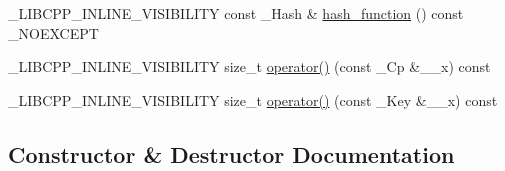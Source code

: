 \begin{DoxyCompactItemize}
\item 
\+\_\+\+L\+I\+B\+C\+P\+P\+\_\+\+I\+N\+L\+I\+N\+E\+\_\+\+V\+I\+S\+I\+B\+I\+L\+I\+T\+Y const \+\_\+\+Hash \& \hyperlink{class______map__hasher_3_01___key_00_01___cp_00_01___hash_00_01false_01_4_a36b4694cf944a1a28969d3f6917cc9a9}{hash\+\_\+function} () const \+\_\+\+N\+O\+E\+X\+C\+E\+P\+T
\item 
\+\_\+\+L\+I\+B\+C\+P\+P\+\_\+\+I\+N\+L\+I\+N\+E\+\_\+\+V\+I\+S\+I\+B\+I\+L\+I\+T\+Y size\+\_\+t \hyperlink{class______map__hasher_3_01___key_00_01___cp_00_01___hash_00_01false_01_4_a4320bf7187c7c20511393415142a3651}{operator()} (const \+\_\+\+Cp \&\+\_\+\+\_\+x) const 
\item 
\+\_\+\+L\+I\+B\+C\+P\+P\+\_\+\+I\+N\+L\+I\+N\+E\+\_\+\+V\+I\+S\+I\+B\+I\+L\+I\+T\+Y size\+\_\+t \hyperlink{class______map__hasher_3_01___key_00_01___cp_00_01___hash_00_01false_01_4_a81e792db8b661f6bbd204d69ffe6eb86}{operator()} (const \+\_\+\+Key \&\+\_\+\+\_\+x) const 
\end{DoxyCompactItemize}


\subsection{Constructor \& Destructor Documentation}
\hypertarget{class______map__hasher_3_01___key_00_01___cp_00_01___hash_00_01false_01_4_ae1078b1247c357a13a8d2f6ef1ec4399}{}
